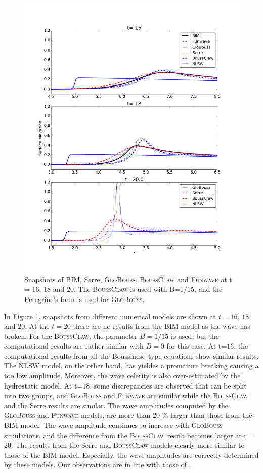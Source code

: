 \documentclass[review]{elsarticle}
\newcommand{\BoussClaw}{\textsc{BoussClaw} }
\newcommand{\BoussClawt}{\textsc{BoussClaw}}
\begin{document}
\begin{figure}[!htb]
\centering
\includegraphics[width=.8\textwidth]{_fig/bim_boussclaw_fun_glob.png}
\caption{Snapshots of BIM, Serre, \textsc{GloBouss}, \BoussClaw
and \textsc{Funwave} at t = $16$, $18$ and $20$.
The \BoussClaw is used with B=$1/15$,
and the Peregrine's form is used for \textsc{GloBouss}.}
\label{fig:bim_boussclaw_fun}
\end{figure}

In Figure \ref{fig:bim_boussclaw_fun}, snapshots from different
numerical models are shown at $t=16$, $18$ and $20$.
At the $t=20$ there are no results from the BIM model as  the wave has broken.
For the \BoussClawt, the parameter $B=1/15$ is used, 
but the computational results are rather similar with $B=0$
for this case. 
At t=$16$, the computational results
from all the Boussinesq-type equations show similar results.
The NLSW model, on the other hand, has yieldes a premature breaking 
causing a too low amplitude. Moreover, the wave celerity is also over-estimated
by the hydrostatic model. 
At t=$18$, some discrepancies are observed 
that can be split into two groups, and
\textsc{GloBouss} and \textsc{Funwave} 
are similar while the \BoussClaw
and the Serre results are similar. 
The wave amplitudes computed by the \textsc{GloBouss} and \textsc{Funwave} models,
are more than 20 \%  larger than those from the BIM model.
The wave amplitude continues to increase 
with \textsc{GloBouss} simulations,
and the difference from the \BoussClaw result 
becomes larger at t = $20$. 
The results from the Serre and \BoussClaw models clearly
more similar to those of the BIM model. 
Especially, the wave amplitudes are correctly determined by these models.
Our observations are in line with those of \citet{wei1995fully}.
 
\end{document}
